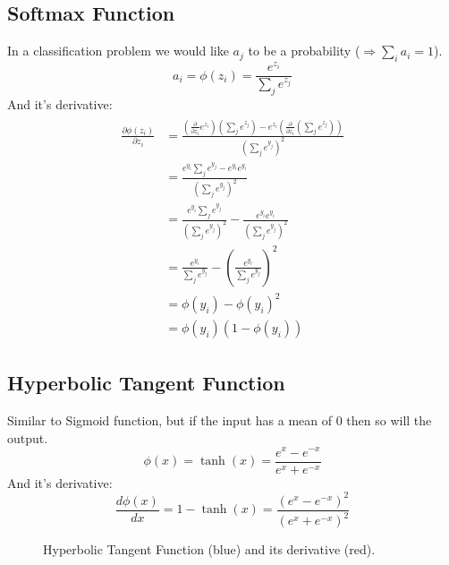 \subsection{Softmax Function}
In a classification problem we would like $a_j$ to be a probability ($\Rightarrow \sum_i a_i = 1$). %
\begin{equation}\label{ed:softmax}
a_i = \phi(z_i) = \frac{e^{z_i}}{\sum_j e^{z_j}}
\end{equation}
And it's derivative:
\begin{align}
\begin{split}\label{ed:softmax_derivative}
\frac{\partial \phi(z_i)}{\partial z_i}
&= \frac{\left(\frac{\partial}{\partial z_i} e^{z_i}\right)(\sum_j e^{z_j}) - e^{z_i} \left(\frac{\partial}{\partial z_i}(\sum_j e^{z_j})\right)}{(\sum_j e^{y_j})^2}\\
&= \frac{e^{y_i} \sum_j e^{y_j} - e^{y_i} e^{y_i}}{(\sum_j e^{y_j})^2}\\
&= \frac{e^{y_i} \sum_j e^{y_j}}{(\sum_j e^{y_j})^2} - \frac{e^{y_i} e^{y_i}}{(\sum_j e^{y_j})^2}\\
&= \frac{e^{y_i}}{\sum_j e^{y_j}} - \left(\frac{e^{y_i}}{\sum_j e^{y_j}}\right)^2\\
&= \phi(y_i) - \phi(y_i)^2\\
&= \phi(y_i) (1 - \phi(y_i))
\end{split}
\end{align}

\subsection{Hyperbolic Tangent Function}
Similar to Sigmoid function, but if the input has a mean of $0$ then so will the output. %
\begin{equation}
\phi(x) = \tanh(x) = \frac{e^x - e^{-x}}{e^x + e^{-x}}
\end{equation}
And it's derivative:
\begin{equation}
\frac{d\phi(x)}{dx} = 1 - \tanh(x) = \frac{(e^x - e^{-x})^2}{(e^x + e^{-x})^2}
\end{equation}
\begin{figure}
\centering
{}
\caption{Hyperbolic Tangent Function (blue) and its derivative (red).}
\end{figure}

